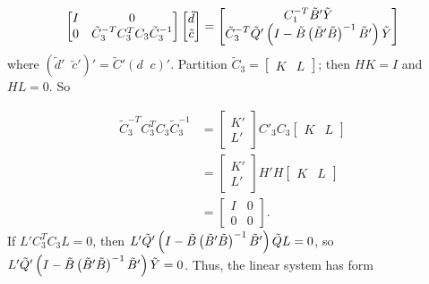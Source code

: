 \begin{equation} \label{eq:vectorized-normal-equations-cholesky}
\begin{bmatrix}
I & 0 \\
0 & \tilde{C}_3^{-T} C_3^{T} C_3 \tilde{C}_3^{-1}\\
\end{bmatrix}
\begin{bmatrix}
\tilde{d}\\
\tilde{c}\\
\end{bmatrix}
= \begin{bmatrix}
C_1^{-T} \tilde{B}'\tilde{Y} \\
\tilde{C}_3^{-T} \tilde{Q}'\left( I - \tilde{B}\left( \tilde{B}' \tilde{B} \right)^{-1} \tilde{B}' \right) \tilde{Y}\\
\end{bmatrix}
\end{equation}
\noindent
where $\left( \tilde{d}'\;\;\tilde{c}' \right)' =  \tilde{C}' \left( d\;\;c \right)'$. Partition $\tilde{C}_3 = \begin{bmatrix} K &  L\end{bmatrix}$; then $HK = I$ and $HL = 0$. So

\begin{align*}
\tilde{C}_3^{-T} C_3^{T} C_3 \tilde{C}_3^{-1} &= \begin{bmatrix} K' \\ L' \end{bmatrix} C'_3C_3 \begin{bmatrix} K &  L\end{bmatrix} \\
&= \begin{bmatrix} K' \\ L' \end{bmatrix} H'H \begin{bmatrix} K &  L\end{bmatrix} \\
&= \begin{bmatrix} I & 0 \\ 0 & 0 \end{bmatrix}.
\end{align*}
\noindent
If $L'C_3^{T} C_3 L = 0$, then $L'\tilde{Q}'\left( I - \tilde{B}\left( \tilde{B}' \tilde{B} \right)^{-1} \tilde{B}' \right)\tilde{Q} L = 0$, so $L'\tilde{Q}'\left( I - \tilde{B}\left( \tilde{B}' \tilde{B} \right)^{-1} \tilde{B}' \right) \tilde{Y} = 0$. Thus, the linear system has form

